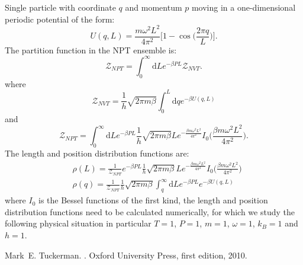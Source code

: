 \documentclass[12pt]{article}
\begin{document}
%
Single particle with coordinate $q$ and momentum $p$ moving in a one-dimensional periodic potential\cite{tuckerman} of the form:
%
\begin{equation}
U(q,L)=\frac{m\omega^{2}L^{2}}{4\pi^{2}}\bigg[1-\cos\Big(\frac{2\pi q}{L}\Big)\bigg]. \nonumber
\end{equation}
%
The partition function in the NPT ensemble is:
%
\begin{equation}
\mathcal{Z}_{NPT}=\int_{0}^{\infty}\mathrm{d}Le^{-\beta PL}\mathcal{Z}_{NVT}. \nonumber
\end{equation}
%
where 
%
\begin{equation}
\mathcal{Z}_{NVT}=\frac{1}{h}\sqrt{2\pi m\beta}\int_{0}^{L}\mathrm{d}q e^{-\beta U(q,L)} \nonumber 
\end{equation}
%
and
%
\begin{equation}
\mathcal{Z}_{NPT}=\int_{0}^{\infty}\mathrm{d}L e^{-\beta PL}\frac{1}{h}\sqrt{2\pi m\beta}L e^{-\frac{\beta m\omega^{2}L^{2}}{4\pi^{2}}}I_{0}\Big(\frac{\beta m\omega^{2}L^{2}}{4\pi^{2}}\Big). \nonumber 
\end{equation}
%
The length and position distribution functions are:
%
\begin{align}
&\rho(L)= \frac{1}{\mathcal{Z}_{NPT}} e^{-\beta PL}\frac{1}{h}\sqrt{2\pi m\beta}L e^{-\frac{\beta m\omega^{2}L^{2}}{4\pi^{2}}}I_{0}\Big(\frac{\beta m\omega^{2}L^{2}}{4\pi^{2}}\Big) \nonumber \\
&\rho(q)=\frac{1}{\mathcal{Z}_{NPT}}\frac{1}{h}\sqrt{2\pi m\beta}\int_{q}^{\infty}\mathrm{d}L e^{-\beta PL}e^{-\beta U(q,L)}
\label{eqn:partition-NPT}
\end{align}
% 
where $I_{0}$ is the Bessel functions of the first kind, the length and position distribution functions need to be calculated numerically, for which we study the following physical situation in particular $T=1$, $P=1$, $m=1$, $\omega=1$, $k_{B}=1$ and $h=1$.
%

\begin{thebibliography}{1}

Mark~E. Tuckerman.
.
\newblock Oxford University Press, first edition, 2010.

\end{thebibliography}
\end{document}
